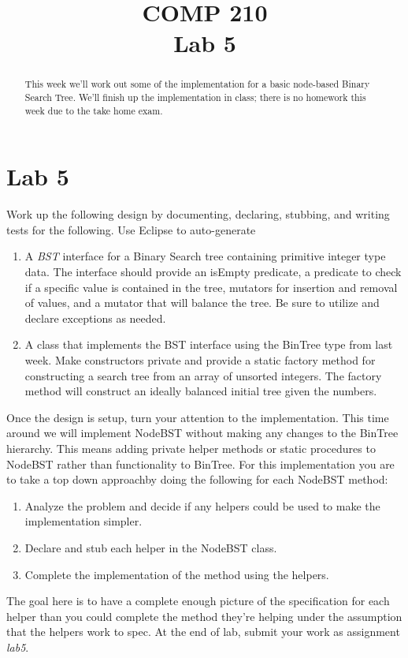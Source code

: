 \documentclass[nobib]{tufte-handout}
\title{COMP 210 \\ Lab 5}
\begin{document}
\maketitle

\begin{abstract}
This week we'll work out some of the implementation for a basic node-based Binary Search Tree. We'll finish up the implementation in class; there is no homework this week due to the take home exam.
\end{abstract}

\section{Lab 5}

Work up the following design by documenting, declaring, stubbing, and writing tests for the following. Use Eclipse to auto-generate
\begin{enumerate}
  \item A \textit{BST} interface for a Binary Search tree containing primitive integer type data. The interface should provide an isEmpty predicate, a predicate to check if a specific value is contained in the tree, mutators for insertion and removal of values, and a mutator that will balance the tree. Be sure to utilize and declare exceptions as needed.
  \item A  class that implements the BST interface using the BinTree type from last week. Make constructors private and provide a static factory method for constructing a search tree from an array of unsorted integers. The factory method will construct an ideally balanced initial tree given the numbers.
\end{enumerate}

Once the design is setup, turn your attention to the implementation. This time around we will implement NodeBST without making any changes to the BinTree hierarchy. This means adding private helper methods or static procedures to NodeBST rather than functionality to BinTree. For this implementation you are to take a top down approachby doing the following for each NodeBST method:
\begin{enumerate}
  \item Analyze the problem and decide if any helpers could be used to make the implementation simpler.
  \item Declare and stub each helper in the NodeBST class.
  \item Complete the implementation of the method using the helpers.
\end{enumerate}
The goal here is to have a complete enough picture of the specification for each helper than you could complete the method they're helping under the assumption that the helpers work to spec. At the end of lab, submit your work as assignment \textit{lab5}.
\end{document}
